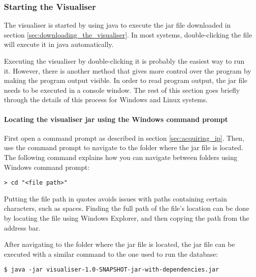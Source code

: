 \documentclass[../document.tex]{subfiles}
\begin{document}
\subsubsection{Starting the Visualiser}
The visualiser is started by using java to execute the jar file downloaded in section \ref{sec:downloading_the_visualiser}. In most systems, double-clicking the file will execute it in java automatically.

Executing the visualiser by double-clicking it is probably the easiest way to run it. However, there is another method that gives more control over the program by making the program output visible. In order to read program output, the jar file needs to be executed in a console window. The rest of this section goes briefly through the details of this process for Windows and Linux systems.

\paragraph{Locating the visualiser jar using the Windows command prompt}
First open a command prompt as described in section \ref{sec:acquiring_ip}. Then, use the command prompt to navigate to the folder where the jar file is located. The following command explains how you can navigate between folders using Windows command prompt:
\lstset{style=custombash}
\begin{lstlisting}[caption=Windows command to change current folder]
> cd "<file path>"
\end{lstlisting}
Putting the file path in quotes avoids issues with paths containing certain characters, such as spaces. Finding the full path of the file's location can be done by locating the file using Windows Explorer, and then copying the path from the address bar.

After navigating to the folder where the jar file is located, the jar file can be executed with a similar command to the one used to run the database:
\begin{lstlisting}[caption=Command to execute the visualiser in Java.]
$ java -jar visualiser-1.0-SNAPSHOT-jar-with-dependencies.jar
\end{lstlisting}
\end{document}
